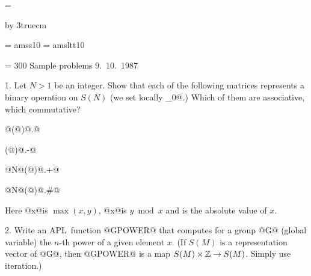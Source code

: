 


\magnification = 

\advance\vsize by 3truecm





\font\sans = amss10
\font\sltt = amsltt10

\def\header{{\sans  Sample problems  9.\ 10.\ 1987}}
\def\APL{{\sltt APL}}

\nopagenumbers
\tolerance = 300
\noindent
\header

\vskip 2cm

\item{1.} Let $N>1$ be an integer. Show that each of the following
          matrices represents a binary operation on
          $S(N)$ (we set locally \BX@IO_0@.) Which of them are
          associative, which commutative?
          \medskip

           @(@\IO@N)@\SO@.@\CE\IO@N@

           \AB@(@\IO@N)@\SO@.-@\IO@N@

           @N@\AB@(@\IO@N)@\SO@.+@\IO@N@

           @N@\AB@(@\IO@N)@\SO@.#@\IO@N@

           \medskip
\item{}    Here @x@\CE@y@ is $\max(x,y)$, @x@\AB@y@ is
           $y\bmod x$ and \AB@x@ is the absolute value of $x$.

\bigskip

\item{2.} Write an \APL\ function @GPOWER@ that computes for a group
          @G@ (global variable) the $n$-th power of a given element $x$.
          (If $S(M)$ is a representation vector of @G@, then
          @GPOWER@ is a map $S(M)\times \Bbb Z\to S(M)$. Simply
          use iteration.)

